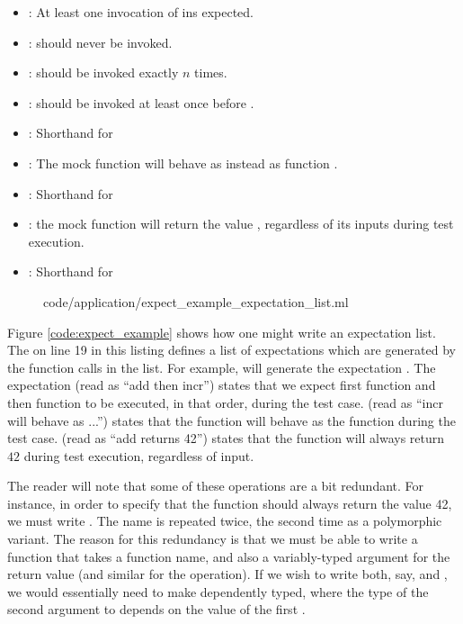 \begin{itemize}
\item {}: At least one invocation of  ins
  expected.
\item {}:  should never be invoked.
\item {}:  should be invoked exactly $n$
  times.
\item {}:  should be invoked at least once
  before .
\item {}: Shorthand for 
\item {}: The mock function  will behave as
  instead as function .
\item {}: Shorthand for 
\item {}: the mock function  will return the
  value , regardless of its inputs during test execution.
\item {}: Shorthand for 
\end{itemize}

\begin{figure}
 {code/application/expect_example_expectation_list.ml}
\end{figure}

Figure \ref{code:expect_example} shows how one might write an
expectation list. The  on line 19 in this listing defines
a list of expectations which are generated by the function calls in
the list. For example,  will generate the expectation
. The expectation  (read as ``add
then incr'') states that we expect first function  and then
function  to be executed, in that order, during the test
case.   (read as ``incr will behave
as ...'')  states that the  function will behave as the
function  during the test case.
 (read as ``add returns 42'') states that the
 function will always return $42$ during test execution,
regardless of input.

The reader will note that some of these operations are a bit
redundant. For instance, in order to specify that the 
function should always return the value 42, we must write
. The name  is repeated twice, the
second time as a polymorphic variant. The reason for this redundancy
is that we must be able to write a  function that takes
a function name, and also a variably-typed argument for the return
value (and similar for the  operation). If we wish to write
both, say,  and , we would
essentially need to make \code{*->} dependently typed, where the type
of the second argument to \code{*->} depends on the value of the first
\cite[Chapter 2]{pierce:atapl}.

